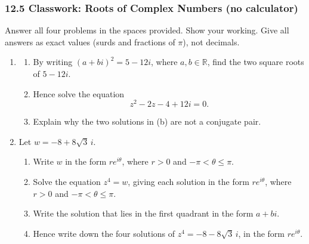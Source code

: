 \documentclass[12pt, twoside]{article}
\begin{document}
\subsubsection*{12.5 Classwork: Roots of Complex Numbers (no calculator)}

Answer all four problems in the spaces provided. Show your working. Give all
answers as exact values (surds and fractions of $\pi$), not decimals.

\begin{enumerate}[itemsep=0.15cm]

\item[1.]

\begin{enumerate}[itemsep=0.15cm]
  \item By writing $(a + bi)^{2} = 5 - 12i$, where $a, b \in \mathbb{R}$,
  find the two square roots of $5 - 12i$.
  \item Hence solve the equation
  $$z^{2} - 2z - 4 + 12i = 0.$$
  \item Explain why the two solutions in (b) are not a conjugate pair.
\end{enumerate}


\newpage

\item[2.]

Let $w = -8 + 8\sqrt{3}\,i$.

\begin{enumerate}[itemsep=0.15cm]
  \item Write $w$ in the form $re^{i\theta}$, where $r > 0$ and
  $-\pi < \theta \leq \pi$.
  \item Solve the equation $z^{4} = w$, giving each solution in the form
  $re^{i\theta}$, where $r > 0$ and $-\pi < \theta \leq \pi$.
  \item Write the solution that lies in the first quadrant in the form
  $a + bi$.
  \item Hence write down the four solutions of
  $z^{4} = -8 - 8\sqrt{3}\,i$, in the form $re^{i\theta}$.
\end{enumerate}


\end{enumerate}
\end{document}
